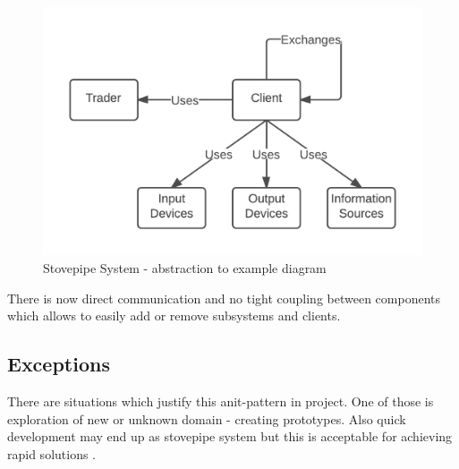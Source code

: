 \begin{figure}[!h]
    \centering
    \includegraphics[scale=0.3]{Images/ssexamplesolution.png}
    \caption[Stovepipe System Example Solution]{Stovepipe System - abstraction to example diagram \cite{Solutions}}
    \label{fig:StovepipeSystemExampleSolution}
\end{figure}

There is now direct communication and no tight coupling between components which allows to easily add or remove subsystems and clients.

\subsection{Exceptions}

There are situations which justify this anit-pattern in project. One of those is exploration of new or unknown domain - creating prototypes. Also quick development may end up as stovepipe system but this is acceptable for achieving rapid solutions \cite{SurvivalGuide,Virtual}.